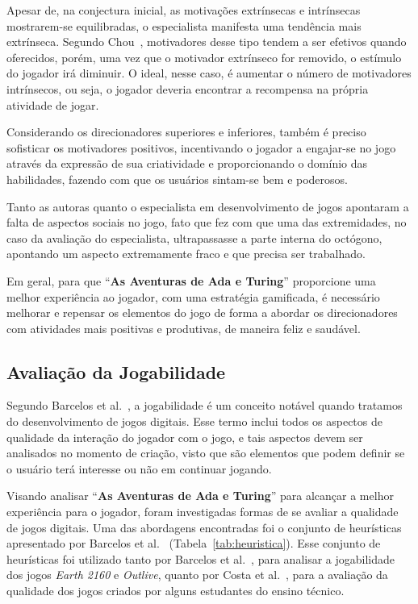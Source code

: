 Apesar de, na conjectura inicial, as motivações extrínsecas e intrínsecas mostrarem-se equilibradas, o especialista manifesta uma tendência mais extrínseca. Segundo Chou~\cite{chou_octalysis_2015}, motivadores desse tipo tendem a ser efetivos quando oferecidos, porém, uma vez que o motivador extrínseco for removido, o estímulo do jogador irá diminuir. O ideal, nesse caso, é aumentar o número de motivadores intrínsecos, ou seja, o jogador deveria encontrar a recompensa na própria atividade de jogar.

Considerando os direcionadores superiores e inferiores, também é preciso sofisticar os motivadores positivos, incentivando o jogador a engajar-se no jogo através da expressão de sua criatividade e proporcionando o domínio das habilidades, fazendo com que os usuários sintam-se bem e poderosos.

Tanto as autoras quanto o especialista em desenvolvimento de jogos apontaram a falta de aspectos sociais no jogo, fato que fez com que uma das extremidades, no caso da avaliação do especialista, ultrapassasse a parte interna do octógono, apontando um aspecto extremamente fraco e que precisa ser trabalhado.

Em geral, para que “\textbf{As Aventuras de Ada e Turing}” proporcione uma melhor experiência ao jogador, com uma estratégia gamificada, é necessário melhorar e repensar os elementos do jogo de forma a abordar os direcionadores com atividades mais positivas e produtivas, de maneira feliz e saudável.

\subsection{Avaliação da Jogabilidade} \label{ssec:avaliacao_jogabilidade}

Segundo Barcelos et al.~\cite{barcelos_alise_2011}, a jogabilidade é um conceito notável quando tratamos do desenvolvimento de jogos digitais. Esse termo inclui todos os aspectos de qualidade da interação do jogador com o jogo, e tais aspectos devem ser analisados no momento de criação, visto que são elementos que podem definir se o usuário terá interesse ou não em continuar jogando.

Visando analisar “\textbf{As Aventuras de Ada e Turing}” para alcançar a melhor experiência para o jogador, foram investigadas formas de se avaliar a qualidade de jogos digitais. Uma das abordagens encontradas foi o conjunto de heurísticas apresentado por Barcelos et al.~\cite{barcelos_alise_2011} (Tabela~\ref{tab:heuristica}). Esse conjunto de heurísticas foi utilizado tanto por Barcelos et al.~\cite{barcelos_alise_2011}, para analisar a jogabilidade dos jogos \textit{Earth 2160} e \textit{Outlive}, quanto por Costa et al.~\cite{costa_construindo_2013}, para a avaliação da qualidade dos jogos criados por alguns estudantes do ensino técnico.

